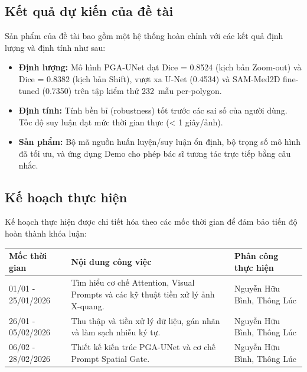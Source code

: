 \documentclass{article}[14pt]
\begin{document}
{    \subsection{Kết quả dự kiến của đề tài}
        
    Sản phẩm của đề tài bao gồm một hệ thống hoàn chỉnh với các kết quả định lượng và định tính như sau:
    \begin{itemize}
        \item \textbf{Định lượng:} Mô hình PGA-UNet đạt Dice = 0.8524 (kịch bản Zoom-out) và Dice = 0.8382 (kịch bản Shift), vượt xa U-Net (0.4534) và SAM-Med2D fine-tuned (0.7350) trên tập kiểm thử 232~mẫu per-polygon.
        \item \textbf{Định tính:} Tính bền bỉ (robustness) tốt trước các sai số của người dùng. Tốc độ suy luận đạt mức thời gian thực (< 1 giây/ảnh).
        \item \textbf{Sản phẩm:} Bộ mã nguồn huấn luyện/suy luận ổn định, bộ trọng số mô hình đã tối ưu, và ứng dụng Demo cho phép bác sĩ tương tác trực tiếp bằng câu nhắc.
    \end{itemize}

    \subsection{Kế hoạch thực hiện}
    
    Kế hoạch thực hiện được chi tiết hóa theo các mốc thời gian để đảm bảo tiến độ hoàn thành khóa luận:

    \begin{table}[H]
    \centering
    \renewcommand{\arraystretch}{1.5}
    \begin{tabular}{|p{3.5cm}|p{7.5cm}|p{5cm}|}
    \hline
    \rowcolor[gray]{0.9} \textbf{Mốc thời gian} & \textbf{Nội dung công việc} & \textbf{Phân công thực hiện} \\ \hline
    
    01/01 - 25/01/2026 & Tìm hiểu cơ chế Attention, Visual Prompts và các kỹ thuật tiền xử lý ảnh X-quang. & Nguyễn Hữu Bình, Thông Lúc \\ \hline
    
    26/01 - 05/02/2026 & Thu thập và tiền xử lý dữ liệu, gán nhãn và làm sạch nhiễu ký tự. & Nguyễn Hữu Bình, Thông Lúc\\ \hline
    
    06/02 - 28/02/2026 & Thiết kế kiến trúc PGA-UNet và cơ chế Prompt Spatial Gate. & Nguyễn Hữu Bình, Thông Lúc \\ \hline
    

\end{tabular}
\end{table}}
\end{document}
